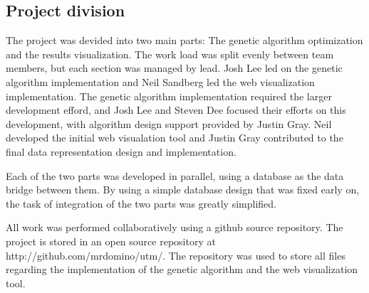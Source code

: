 \subsection{Project division}

The project was devided into two main parts: The genetic algorithm optimization and the results visualization. The work load was split evenly between team members, but each section was managed by lead. Josh Lee led on the genetic algorithm implementation and Neil Sandberg led the web visualization implementation. The genetic algorithm implementation required the larger development efford, and Josh Lee and Steven Dee focused their efforts on this development, with algorithm design support provided by Justin Gray. Neil developed the initial web visualation tool and Justin Gray contributed to the final data representation design and implementation. 

Each of the two parts was developed in parallel, using a database as the data bridge between them. By using a simple database design that was fixed early on, the task of integration of the two parts was greatly simplified. 

All work was performed collaboratively using a github source repository. The project is stored in an open source repository at http://github.com/mrdomino/utm/. The repository was used to store all files regarding the implementation of the genetic algorithm and the web visualization tool.